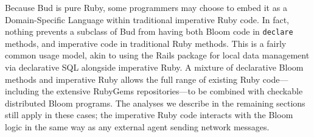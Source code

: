 Because Bud is pure Ruby, some programmers may choose to embed it as a Domain-Specific Language within traditional imperative Ruby code.  In fact, nothing prevents a subclass of Bud from having both Bloom code in {\tt declare} methods, and imperative code in traditional Ruby methods.  This is a fairly common usage model, akin to using the Rails package for local data management via declarative SQL alongside imperative Ruby. A mixture of declarative Bloom methods and imperative Ruby allows the full range of existing Ruby code---including the extensive RubyGems repositories---to be combined with checkable distributed Bloom programs. The analyses we describe in the remaining sections still apply in these cases; the imperative Ruby code interacts with the Bloom logic in the same way as any external agent sending network messages.